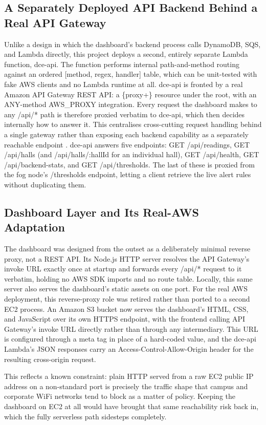 \documentclass[conference]{IEEEtran}
\begin{document}
\subsection{A Separately Deployed API Backend Behind a Real API Gateway}
Unlike a design in which the dashboard's backend process calls DynamoDB, SQS, and Lambda directly, this project deploys a second, entirely separate Lambda function, dce-api. The function performs internal path-and-method routing against an ordered [method, regex, handler] table, which can be unit-tested with fake AWS clients and no Lambda runtime at all. dce-api is fronted by a real Amazon API Gateway REST API: a \{proxy+\} resource under the root, with an ANY-method AWS\_PROXY integration. Every request the dashboard makes to any /api/* path is therefore proxied verbatim to dce-api, which then decides internally how to answer it. This centralises cross-cutting request handling behind a single gateway rather than exposing each backend capability as a separately reachable endpoint \cite{ref11}. dce-api answers five endpoints: GET /api/readings, GET /api/halls (and /api/halls/:hallId for an individual hall), GET /api/health, GET /api/backend-stats, and GET /api/thresholds. The last of these is proxied from the fog node's /thresholds endpoint, letting a client retrieve the live alert rules without duplicating them.

\subsection{Dashboard Layer and Its Real-AWS Adaptation}
The dashboard was designed from the outset as a deliberately minimal reverse proxy, not a REST API. Its Node.js HTTP server resolves the API Gateway's invoke URL exactly once at startup and forwards every /api/* request to it verbatim, holding no AWS SDK imports and no route table. Locally, this same server also serves the dashboard's static assets on one port. For the real AWS deployment, this reverse-proxy role was retired rather than ported to a second EC2 process. An Amazon S3 bucket now serves the dashboard's HTML, CSS, and JavaScript over its own HTTPS endpoint, with the frontend calling API Gateway's invoke URL directly rather than through any intermediary. This URL is configured through a meta tag in place of a hard-coded value, and the dce-api Lambda's JSON responses carry an Access-Control-Allow-Origin header for the resulting cross-origin request.

This reflects a known constraint: plain HTTP served from a raw EC2 public IP address on a non-standard port is precisely the traffic shape that campus and corporate WiFi networks tend to block as a matter of policy. Keeping the dashboard on EC2 at all would have brought that same reachability risk back in, which the fully serverless path sidesteps completely.
\end{document}
